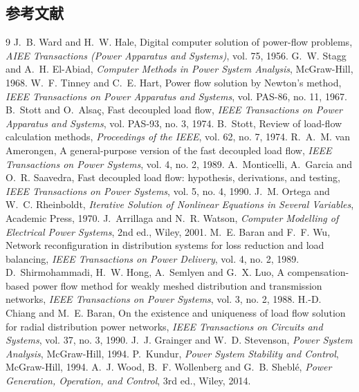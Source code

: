 \subsection{参考文献}
{\renewcommand{\section}[2]{}%
\begin{thebibliography}{9}\small
{} J.~B. Ward and H.~W. Hale, Digital computer solution of
power-flow problems, \emph{AIEE Transactions (Power Apparatus and Systems)},
vol. 75, 1956.
 G.~W. Stagg and A.~H. El-Abiad, \emph{Computer Methods in
Power System Analysis}, McGraw-Hill, 1968.
 W.~F. Tinney and C.~E. Hart, Power flow solution by
Newton's method, \emph{IEEE Transactions on Power Apparatus and Systems},
vol. PAS-86, no. 11, 1967.
 B.~Stott and O.~Alsa\c{c}, Fast decoupled load flow,
\emph{IEEE Transactions on Power Apparatus and Systems}, vol. PAS-93, no. 3, 1974.
 B.~Stott, Review of load-flow calculation methods,
\emph{Proceedings of the IEEE}, vol. 62, no. 7, 1974.
 R.~A.~M. van Amerongen, A general-purpose version of
the fast decoupled load flow, \emph{IEEE Transactions on Power Systems},
vol. 4, no. 2, 1989.
 A.~Monticelli, A.~Garcia and O.~R. Saavedra, Fast
decoupled load flow: hypothesis, derivations, and testing, \emph{IEEE
Transactions on Power Systems}, vol. 5, no. 4, 1990.
 J.~M. Ortega and W.~C. Rheinboldt, \emph{Iterative Solution
of Nonlinear Equations in Several Variables}, Academic Press, 1970.
 J.~Arrillaga and N.~R. Watson, \emph{Computer Modelling
of Electrical Power Systems}, 2nd ed., Wiley, 2001.
 M.~E. Baran and F.~F. Wu, Network reconfiguration in
distribution systems for loss reduction and load balancing, \emph{IEEE
Transactions on Power Delivery}, vol. 4, no. 2, 1989.
 D.~Shirmohammadi, H.~W. Hong, A.~Semlyen and
G.~X. Luo, A compensation-based power flow method for weakly meshed distribution
and transmission networks, \emph{IEEE Transactions on Power Systems},
vol. 3, no. 2, 1988.
 H.-D. Chiang and M.~E. Baran, On the existence and
uniqueness of load flow solution for radial distribution power networks,
\emph{IEEE Transactions on Circuits and Systems}, vol. 37, no. 3, 1990.
 J.~J. Grainger and W.~D. Stevenson, \emph{Power System
Analysis}, McGraw-Hill, 1994.
 P.~Kundur, \emph{Power System Stability and Control},
McGraw-Hill, 1994.
 A.~J. Wood, B.~F. Wollenberg and G.~B. Shebl\'e,
\emph{Power Generation, Operation, and Control}, 3rd ed., Wiley, 2014.
\end{thebibliography}}
